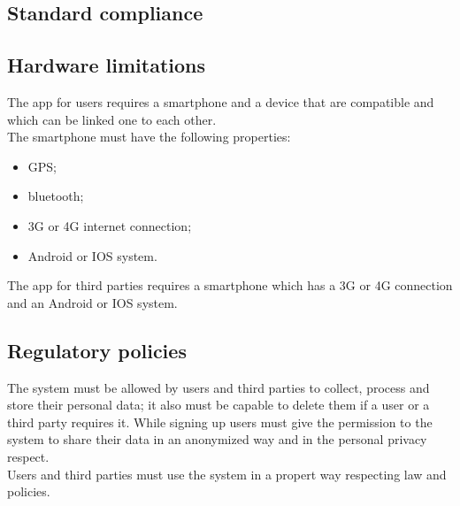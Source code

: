 \subsection{Standard compliance}

\subsection{Hardware limitations}
The app for users requires a smartphone and a device that are compatible and which can be linked one to each other.\\
The smartphone must have the following properties:
\begin{itemize}
	\item GPS;
	\item bluetooth;
	\item 3G or 4G internet connection;
	\item Android or IOS system.

\end{itemize}The app for third parties requires a smartphone which has a 3G or 4G connection and an Android or IOS system.

\subsection{Regulatory policies}
The system must be allowed by users and third parties to collect, process and store their personal data; it also must be capable to delete them if a user or a third party requires it. While signing up users must give the permission to the system to share their data in an anonymized way and in the personal privacy respect.\\
Users and third parties must use the system in a propert way respecting law and policies.